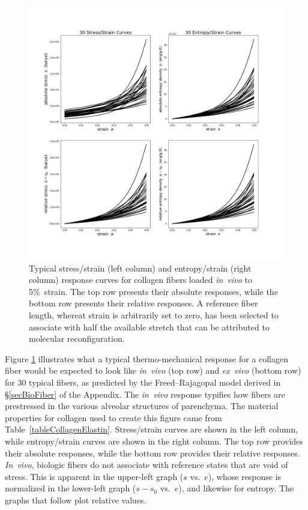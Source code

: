 \begin{figure}
    \includegraphics[width=\textwidth]{figures/bioFibers5.jpg}
    \caption{Typical stress\slash strain (left column) and entropy\slash strain (right column) response curves for collagen fibers loaded \textit{in~vivo\/} to 5\%\ strain. The top row presents their absolute responses, while the bottom row presents their relative responses.  A reference fiber length, whereat strain is arbitrarily set to zero, has been selected to associate with half the available stretch that can be attributed to molecular reconfiguration.}
    \label{figCollagenFibersInVivo}
\end{figure}

Figure \ref{figCollagenFibersInVivo} illustrates what a typical thermo-mechanical response for a collagen fiber would be expected to look like \textit{in~vivo\/} (top row) and \textit{ex~vivo\/} (bottom row) for 30 typical fibers, as predicted by the Freed--Rajagopal \cite{FreedRajagopal16} model derived in \S\ref{secBioFiber} of the Appendix.  The \textit{in~vivo\/} response typifies how fibers are prestressed in the various alveolar structures of parenchyma.  The material properties for collagen used to create this figure came from Table~\ref{tableCollagenElastin}. Stress\slash strain curves are shown in the left column, while entropy\slash strain curves are shown in the right column.  The top row provides their absolute responses, while the bottom row provides their relative responses.  \textit{In~vivo}, biologic fibers do not associate with reference states that are void of stress.  This is apparent in the upper-left graph ($s$ vs.\ $e$), whose response is normalized in the lower-left graph ($s \! - \! s_0$ vs.\ $e$), and likewise for entropy.  The graphs that follow plot relative values.

